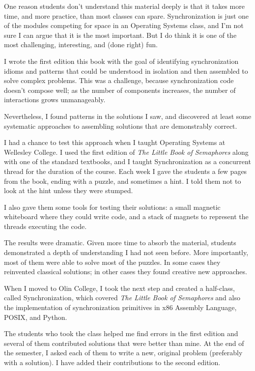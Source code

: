 \documentclass{book}
\begin{document}
One reason students don't understand this material deeply is that
it takes more time, and more practice, than most classes can spare.
Synchronization is just one of the modules competing for space in
an Operating Systems class, and I'm not sure I can argue that it is
the most important.  But I do think it is one of the most challenging,
interesting, and (done right) fun.

I wrote the first edition this book with the goal of identifying
synchronization idioms and patterns that could be 
understood in isolation and then assembled to solve complex problems.
This was a challenge, because synchronization code doesn't compose
well; as the number of components increases, the number of interactions
grows unmanageably.

Nevertheless, I found patterns in the solutions I saw, and discovered
at least some systematic approaches to assembling solutions that are
demonstrably correct.

I had a chance to test this approach when I taught Operating Systems
at Wellesley College.  I used the first edition of {\em The Little
Book of Semaphores} along with one of the standard textbooks, and I
taught Synchronization as a concurrent thread for the duration of the
course.  Each week I gave the students a few pages from the book,
ending with a puzzle, and sometimes a hint.  I told them not to look
at the hint unless they were stumped.

I also gave them some tools for testing their solutions: a small
magnetic whiteboard where they could write code, and a stack of
magnets to represent the threads executing the code.

The results were dramatic.  Given more time to absorb the material,
students demonstrated a depth of understanding I had not seen before.
More importantly, most of them were able to solve most of the puzzles.
In some cases they reinvented classical solutions; in other cases
they found creative new approaches.

When I moved to Olin College, I took the next step and created a
half-class, called Synchronization, which covered
{\em The Little Book of Semaphores} and also the implementation of
synchronization primitives in x86 Assembly Language, POSIX, and
Python.

The students who took the class
helped me find errors in the first edition and several
of them contributed solutions that were better than mine.  At the
end of the semester, I asked each of them to write a new,
original problem (preferably with a solution).  I have added their
contributions to the second edition.
\end{document}
